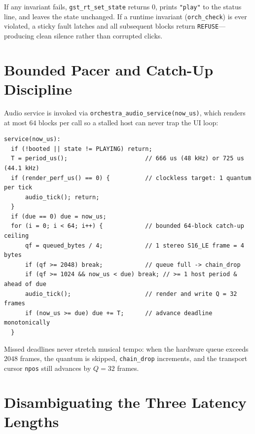 If any invariant fails, \texttt{gst\_rt\_set\_state} returns $0$, prints \texttt{"play"} to the status line, and leaves the state unchanged. If a runtime invariant (\texttt{orch\_check}) is ever violated, a sticky fault latches and all subsequent blocks return \texttt{REFUSE}—producing clean silence rather than corrupted clicks.

\section{Bounded Pacer and Catch-Up Discipline}

Audio service is invoked via \texttt{orchestra\_audio\_service(now\_us)}, which renders at most $64$ blocks per call so a stalled host can never trap the UI loop:

\begin{lstlisting}[caption={Bounded catch-up pacer algorithm in orchestra\_audio\_service.}]
service(now_us):
  if (!booted || state != PLAYING) return;
  T = period_us();                      // 666 us (48 kHz) or 725 us (44.1 kHz)
  if (render_perf_us() == 0) {          // clockless target: 1 quantum per tick
      audio_tick(); return;
  }
  if (due == 0) due = now_us;
  for (i = 0; i < 64; i++) {            // bounded 64-block catch-up ceiling
      qf = queued_bytes / 4;            // 1 stereo S16_LE frame = 4 bytes
      if (qf >= 2048) break;            // queue full -> chain_drop
      if (qf >= 1024 && now_us < due) break; // >= 1 host period & ahead of due
      audio_tick();                     // render and write Q = 32 frames
      if (now_us >= due) due += T;      // advance deadline monotonically
  }
\end{lstlisting}

Missed deadlines never stretch musical tempo: when the hardware queue exceeds $2048$ frames, the quantum is skipped, \texttt{chain\_drop} increments, and the transport cursor \texttt{npos} still advances by $Q = 32$ frames.

\section{Disambiguating the Three Latency Lengths}

